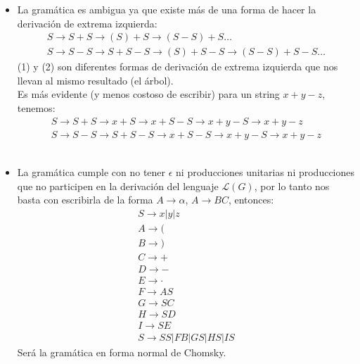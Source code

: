 \documentclass[spanish, fleqn]{article}
\begin{document}
\begin{enumerate}
\begin{itemize}
					\item 
						La gramática es ambigua ya que existe más de una forma
						de hacer la derivación de extrema izquierda:
						\newcommand{\ra}{\rightarrow}
						\begin{gather}
							S \ra S+S \ra (S)+S \ra (S-S)+S\dots \\
							S \ra S-S \ra S+S-S \ra (S)+S-S \ra (S-S)+S-S \dots
						\end{gather}
						(1) y (2) son diferentes formas de derivación de 
						extrema izquierda que nos llevan al mismo resultado
						(el árbol). \\
						Es más evidente (y menos costoso de escribir) para un
						string $x + y - z$, tenemos:
						\begin{gather*}
							S \ra S+S \ra x+S \ra x+S-S \ra x+y-S \ra x+y-z \\
							S \ra S-S \ra S+S-S \ra x+S-S \ra x+y-S \ra x+y-z
						\end{gather*}
						\\
					
					\item 
						La gramática cumple con no tener $\epsilon$ ni 
						producciones unitarias ni producciones que no
						participen en la derivación del lenguaje 
						$\mathcal{L}(G)$, por lo tanto nos basta con escribirla
						de la forma $A\ra \alpha$, $A \ra BC$, entonces:
						\begin{gather*}
							S \ra x|y|z \\ A \ra ( \\ B \ra ) \\ C \ra + \\
							D \ra - \\ E \ra \cdot \\
							F \ra AS \\ G \ra SC \\ H \ra SD \\ I \ra SE \\
							S \ra SS|FB|GS|HS|IS
						\end{gather*}
						Será la gramática en forma normal de Chomsky.
				\end{itemize}
		\end{enumerate}
\end{document}
